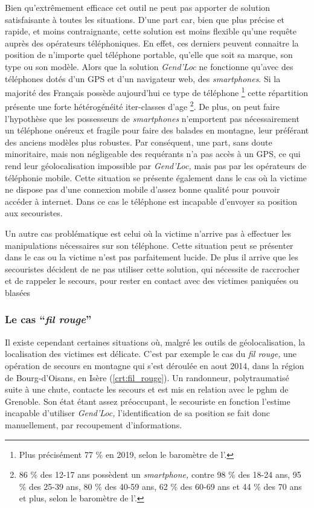 Bien qu’extrêmement efficace cet outil ne peut pas apporter de
solution satisfaisante à toutes les situations. D'une part car, bien
que plus précise et rapide, et moins contraignante, cette solution est
moins flexible qu'une requête auprès des opérateurs téléphoniques.
En effet, ces derniers peuvent connaitre la position de n'importe quel
téléphone portable, qu'elle que soit sa marque, son type ou son
modèle. Alors que la solution \emph{Gend'Loc} ne fonctionne qu'avec
des téléphones dotés d'un GPS et d'un navigateur web, des
\emph{smartphones}. Si la majorité des Français possède aujourd'hui
ce type de téléphone \footnote{Plus précisément 77 \% en 2019, selon
  le baromètre de l'\textcite{ARCEP2019}.} cette répartition présente
une forte hétérogénéité iter-classes d'age \footnote{86 \% des 12-17
  ans possèdent un \emph{smartphone,} contre 98 \% des 18-24 ans, 95
  \% des 25-39 ans, 80 \% des 40-59 ans, 62 \% des 60-69 ans et 44 \%
  des 70 ans et plus, selon le baromètre de
  l'\textcite{ARCEP2019}.}. De plus, on peut faire l'hypothèse que les
possesseurs de \emph{smartphones} n'emportent pas nécessairement un
téléphone onéreux et fragile pour faire des balades en montagne, leur
préférant des anciens modèles plus robustes. Par conséquent, une part,
sans doute minoritaire, mais non négligeable des requérants n'a pas
accès à un GPS, ce qui rend leur géolocalisation impossible par
\emph{Gend'Loc,} mais pas par les opérateurs de téléphonie mobile.
Cette situation se présente également dans le cas où la victime ne
dispose pas d'une connexion mobile d'assez bonne qualité pour pouvoir
accéder à internet. Dans ce cas le téléphone est incapable d'envoyer
sa position aux secouristes.

Un autre cas problématique est celui où la victime n'arrive pas à
effectuer les manipulations nécessaires sur son téléphone. Cette
situation peut se présenter dans le cas ou la victime n'est pas
parfaitement lucide. De plus il arrive que les secouristes décident de
ne pas utiliser cette solution, qui nécessite de raccrocher et de
rappeler le secours, pour rester en contact avec des victimes
paniquées ou blasées

\subsubsection{Le cas \enquote{\emph{fil rouge}}}
\label{subsec:1-1-2-3}

Il existe cependant certaines situations où, malgré les outils de
géolocalisation, la localisation des victimes est délicate. C'est par
exemple le cas du \emph{fil rouge,} une opération de secours en
montagne qui s'est déroulée en aout 2014, dans la région de
Bourg-d'Oisans, en Isère (\autoref{crt:fil_rouge}). Un randonneur,
polytraumatisé suite à une chute, contacte les secours et est mis en
relation avec le \ac{pghm} de Grenoble. Son état étant assez
préoccupant, le secouriste en fonction l'estime incapable d'utiliser
\emph{Gend'Loc,} l'identification de sa position se fait donc
manuellement, par recoupement d'informations.

